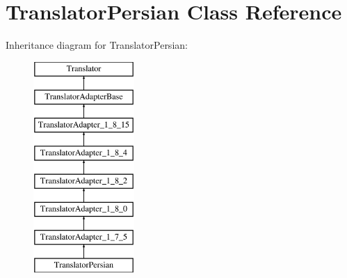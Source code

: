\hypertarget{class_translator_persian}{}\section{Translator\+Persian Class Reference}
\label{class_translator_persian}
Inheritance diagram for Translator\+Persian\+:\begin{figure}[H]
\begin{center}
\leavevmode
\includegraphics[height=8.000000cm]{class_translator_persian}
\end{center}
\end{figure}
